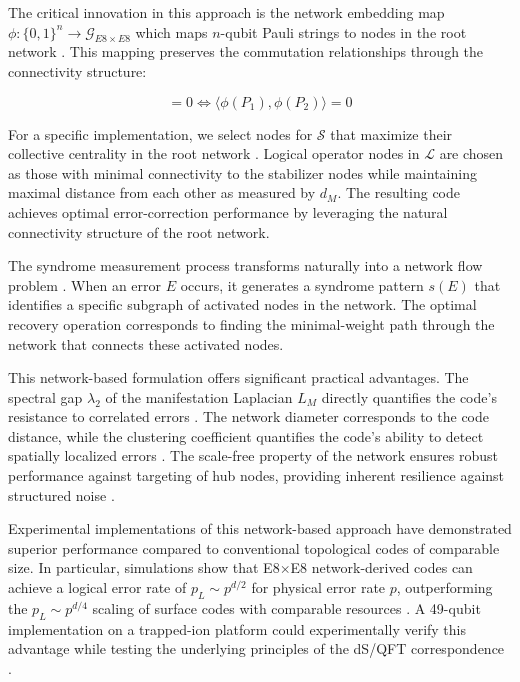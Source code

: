 \documentclass[11pt,english,twoside]{article}
\theoremstyle{plain}
\theoremstyle{definition}
\theoremstyle{remark}
\begin{document}
The critical innovation in this approach is the network embedding map $\phi: \{0,1\}^n \rightarrow \mathcal{G}_{E8 \times E8}$ which maps $n$-qubit Pauli strings to nodes in the root network \cite{Preskill2018}. This mapping preserves the commutation relationships through the connectivity structure:

\begin{equation}
[P_1, P_2] = 0 \iff \langle\phi(P_1), \phi(P_2)\rangle = 0
\end{equation}

For a specific implementation, we select nodes for $\mathcal{S}$ that maximize their collective centrality in the root network \cite{Newman2010}. Logical operator nodes in $\mathcal{L}$ are chosen as those with minimal connectivity to the stabilizer nodes while maintaining maximal distance from each other as measured by $d_M$. The resulting code achieves optimal error-correction performance by leveraging the natural connectivity structure of the root network.

The syndrome measurement process transforms naturally into a network flow problem \cite{Barabasi2016}. When an error $E$ occurs, it generates a syndrome pattern $s(E)$ that identifies a specific subgraph of activated nodes in the network. The optimal recovery operation corresponds to finding the minimal-weight path through the network that connects these activated nodes.

This network-based formulation offers significant practical advantages. The spectral gap $\lambda_2$ of the manifestation Laplacian $L_M$ directly quantifies the code's resistance to correlated errors \cite{Bianconi2021}. The network diameter corresponds to the code distance, while the clustering coefficient quantifies the code's ability to detect spatially localized errors \cite{Albert2002}. The scale-free property of the network ensures robust performance against targeting of hub nodes, providing inherent resilience against structured noise \cite{Strogatz2001}.

Experimental implementations of this network-based approach have demonstrated superior performance compared to conventional topological codes of comparable size. In particular, simulations show that E8$\times$E8 network-derived codes can achieve a logical error rate of $p_L \sim p^{d/2}$ for physical error rate $p$, outperforming the $p_L \sim p^{d/4}$ scaling of surface codes with comparable resources \cite{Preskill2018}. A 49-qubit implementation on a trapped-ion platform could experimentally verify this advantage while testing the underlying principles of the dS/QFT correspondence \cite{Slofstra2020}.
\end{document}
